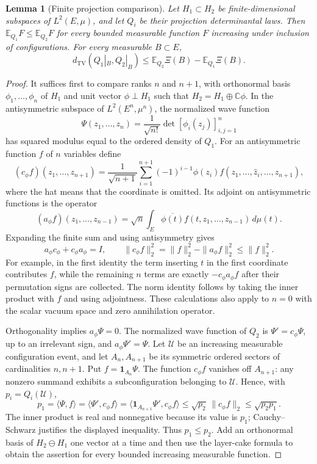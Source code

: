 \documentclass[11pt]{article}
\newtheorem{lemma}[theorem]{Lemma}
\theoremstyle{remark}\newtheorem{remark}[theorem]{Remark}
\begin{document}
\begin{lemma}[Finite projection comparison]
\label{lem:finite-projection-comparison}
Let $H_1\subset H_2$ be finite-dimensional subspaces of $L^2(E,\mu)$,
and let $Q_i$ be their projection determinantal laws.  Then
$\mathbb E_{Q_1}F\le\mathbb E_{Q_2}F$ for every bounded measurable
function $F$ increasing under inclusion of configurations.  For every
measurable $B\subset E$,
\begin{equation}\label{eq:ordered-projection-local-TV}
 d_{\mathrm{TV}}(Q_1|_B,Q_2|_B)
 \le\mathbb E_{Q_2}\Xi(B)-\mathbb E_{Q_1}\Xi(B).
\end{equation}
\end{lemma}
\begin{proof}
It suffices first to compare ranks $n$ and $n+1$, with orthonormal
basis $\phi_1,\ldots,\phi_n$ of $H_1$ and unit vector
$\phi\perp H_1$ such that $H_2=H_1\oplus\mathbb C\phi$.
In the antisymmetric subspace of $L^2(E^n,\mu^n)$, the normalized
wave function
\[
 \Psi(z_1,\ldots,z_n)=\frac1{\sqrt{n!}}
                      \det[\phi_i(z_j)]_{i,j=1}^n
\]
has squared modulus equal to the ordered density of $Q_1$.
For an antisymmetric function $f$ of $n$ variables define
\[
 (c_\phi f)(z_1,\ldots,z_{n+1})
 =\frac1{\sqrt{n+1}}\sum_{i=1}^{n+1}(-1)^{i-1}\phi(z_i)
                        f(z_1,\ldots,\widehat z_i,\ldots,z_{n+1}),
\]
where the hat means that the coordinate is omitted.  Its adjoint on
antisymmetric functions is the operator
\[
 (a_\phi f)(z_1,\ldots,z_{n-1})
   =\sqrt n\int_E\overline{\phi(t)}f(t,z_1,\ldots,z_{n-1})\,d\mu(t).
\]
Expanding the finite sum and using antisymmetry gives
\[
 a_\phi c_\phi+c_\phi a_\phi=I,
 \qquad
 \|c_\phi f\|_2^2=\|f\|_2^2-\|a_\phi f\|_2^2\le\|f\|_2^2.
\]
For example, in the first identity the term inserting $t$ in the first
coordinate contributes $f$, while the remaining $n$ terms are exactly
$-c_\phi a_\phi f$ after their permutation signs are collected.  The
norm identity follows by taking the inner product with $f$ and using
adjointness.  These calculations also apply to $n=0$ with the scalar
vacuum space and zero annihilation operator.

Orthogonality implies $a_\phi\Psi=0$.  The normalized wave function
of $Q_2$ is $\Psi'=c_\phi\Psi$, up to an irrelevant sign, and
$a_\phi\Psi'=\Psi$.  Let $\mathcal U$ be an increasing measurable
configuration event, and let $A_n,A_{n+1}$ be its symmetric ordered
sectors of cardinalities $n,n+1$.  Put $f=\mathbf1_{A_n}\Psi$.
The function $c_\phi f$ vanishes off $A_{n+1}$: any nonzero summand
exhibits a subconfiguration belonging to $\mathcal U$.  Hence, with
$p_i=Q_i(\mathcal U)$,
\[
 p_1=\langle\Psi,f\rangle
     =\langle\Psi',c_\phi f\rangle
     =\langle\mathbf1_{A_{n+1}}\Psi',c_\phi f\rangle
     \le\sqrt{p_2}\,\|c_\phi f\|_2
     \le\sqrt{p_2p_1}.
\]
The inner product is real and nonnegative because its value is $p_1$;
Cauchy--Schwarz justifies the displayed inequality.  Thus $p_1\le p_2$.
Add an orthonormal basis of $H_2\ominus H_1$ one vector at a time and
then use the layer-cake formula to obtain the assertion for every
bounded increasing measurable function.


\end{proof}
\end{document}
